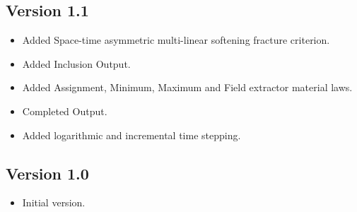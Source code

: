 \documentclass[10pt]{article}
\begin{document}
\subsection*{Version 1.1}
\begin{itemize}
	\item Added Space-time asymmetric multi-linear softening fracture criterion.
	\item Added Inclusion Output.
	\item Added Assignment, Minimum, Maximum and Field extractor material laws.
	\item Completed Output.
	\item Added logarithmic and incremental time stepping.
\end{itemize}

\subsection*{Version 1.0}
\begin{itemize}
	\item Initial version.
\end{itemize}
	
\end{document}

